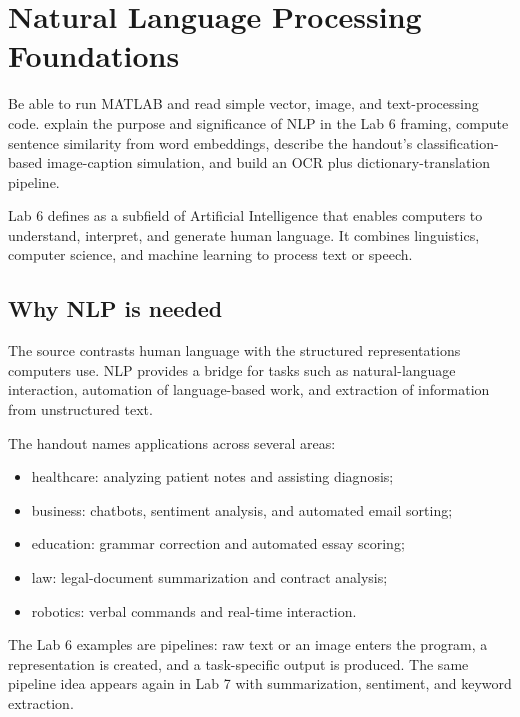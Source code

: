 \chapter{Natural Language Processing Foundations}
\label{ch:nlp-foundations}

\chapterguide%
  {Be able to run MATLAB and read simple vector, image, and text-processing code.}
  {explain the purpose and significance of NLP in the Lab 6 framing, compute sentence similarity from word embeddings, describe the handout's classification-based image-caption simulation, and build an OCR plus dictionary-translation pipeline.}

Lab 6 defines  as a subfield of Artificial Intelligence that enables computers to understand, interpret, and generate human language. It combines linguistics, computer science, and machine learning to process text or speech.

\section{Why NLP is needed}

The source contrasts human language with the structured representations computers use. NLP provides a bridge for tasks such as natural-language interaction, automation of language-based work, and extraction of information from unstructured text.

The handout names applications across several areas:
\begin{itemize}
  \item healthcare: analyzing patient notes and assisting diagnosis;
  \item business: chatbots, sentiment analysis, and automated email sorting;
  \item education: grammar correction and automated essay scoring;
  \item law: legal-document summarization and contract analysis;
  \item robotics: verbal commands and real-time interaction.
\end{itemize}

\begin{keyidea}
The Lab 6 examples are pipelines: raw text or an image enters the program, a representation is created, and a task-specific output is produced. The same pipeline idea appears again in Lab 7 with summarization, sentiment, and keyword extraction.
\end{keyidea}

